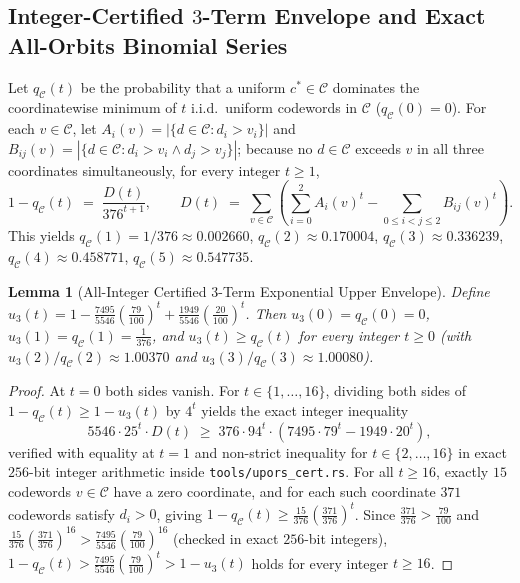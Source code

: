 \documentclass[11pt,a4paper]{article}
\newtheorem{lemma}[theorem]{Lemma}
\theoremstyle{definition}
\theoremstyle{remark}
\newcommand{\calC}{\mathcal{C}}
\begin{document}
\subsection{Integer-Certified $3$-Term Envelope and Exact All-Orbits Binomial Series}
Let $q_\calC(t)$ be the probability that a uniform $c^* \in \calC$ dominates the coordinatewise minimum of $t$ i.i.d.\ uniform codewords in $\calC$ ($q_\calC(0) = 0$). For each $v \in \calC$, let $A_i(v) = |\{d \in \calC : d_i > v_i\}|$ and $B_{ij}(v) = |\{d \in \calC : d_i > v_i \wedge d_j > v_j\}|$; because no $d \in \calC$ exceeds $v$ in all three coordinates simultaneously, for every integer $t \ge 1$,
\[
  1 - q_\calC(t) \;=\; \frac{D(t)}{376^{t+1}}, \qquad D(t) \;=\; \sum_{v \in \calC} \left(\sum_{i=0}^{2} A_i(v)^t - \sum_{0 \le i < j \le 2} B_{ij}(v)^t\right).
\]
This yields $q_\calC(1) = 1/376 \approx 0.002660$, $q_\calC(2) \approx 0.170004$, $q_\calC(3) \approx 0.336239$, $q_\calC(4) \approx 0.458771$, $q_\calC(5) \approx 0.547735$.

\begin{lemma}[All-Integer Certified $3$-Term Exponential Upper Envelope]
\label{lem:envelope}
Define $u_3(t) = 1 - \frac{7495}{5546}(\frac{79}{100})^t + \frac{1949}{5546}(\frac{20}{100})^t$. Then $u_3(0) = q_\calC(0) = 0$, $u_3(1) = q_\calC(1) = \frac{1}{376}$, and $u_3(t) \ge q_\calC(t)$ for \emph{every} integer $t \ge 0$ (with $u_3(2)/q_\calC(2) \approx 1.00370$ and $u_3(3)/q_\calC(3) \approx 1.00080$).
\end{lemma}
\begin{proof}
At $t = 0$ both sides vanish. For $t \in \{1, \dots, 16\}$, dividing both sides of $1 - q_\calC(t) \ge 1 - u_3(t)$ by $4^t$ yields the exact integer inequality
\[
  5546 \cdot 25^t \cdot D(t) \;\ge\; 376 \cdot 94^t \cdot (7495 \cdot 79^t - 1949 \cdot 20^t),
\]
verified with equality at $t = 1$ and non-strict inequality for $t \in \{2,\dots,16\}$ in exact $256$-bit integer arithmetic inside \texttt{tools/upors\_cert.rs}. For all $t \ge 16$, exactly $15$ codewords $v \in \calC$ have a zero coordinate, and for each such coordinate $371$ codewords satisfy $d_i > 0$, giving $1 - q_\calC(t) \ge \frac{15}{376}(\frac{371}{376})^t$. Since $\frac{371}{376} > \frac{79}{100}$ and $\frac{15}{376}(\frac{371}{376})^{16} > \frac{7495}{5546}(\frac{79}{100})^{16}$ (checked in exact $256$-bit integers), $1 - q_\calC(t) > \frac{7495}{5546}(\frac{79}{100})^t > 1 - u_3(t)$ holds for every integer $t \ge 16$.
\end{proof}
\end{document}
